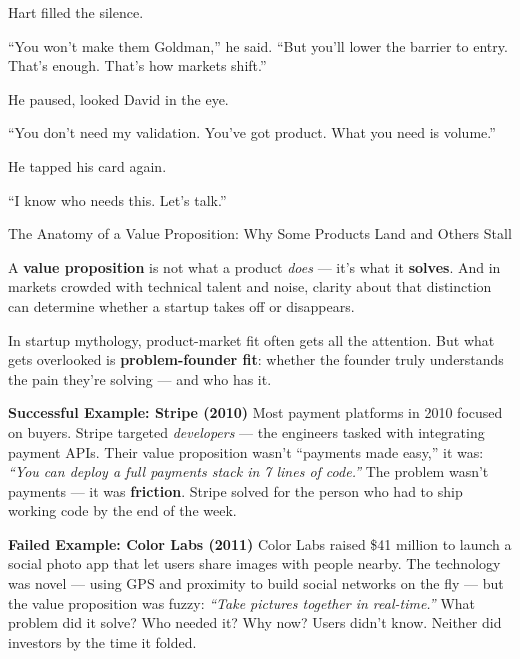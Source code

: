 Hart filled the silence.

“You won’t make them Goldman,” he said. “But you’ll lower the barrier to entry. That’s enough. That’s how markets shift.”

\medskip

He paused, looked David in the eye.

“You don’t need my validation. You’ve got product. What you need is volume.”

\medskip

He tapped his card again.

``I know who needs this. Let’s talk.''

\medskip

\begin{HistoricalSidebar}{The Anatomy of a Value Proposition: Why Some Products Land and Others Stall}

  A \textbf{value proposition} is not what a product \textit{does} — it's what it \textbf{solves}. And in markets 
  crowded with technical talent and noise, clarity about that distinction can determine whether a startup takes 
  off or disappears.
  
  \medskip
  
  In startup mythology, product-market fit often gets all the attention. But what gets overlooked is \textbf{problem-founder fit}: 
  whether the founder truly understands the pain they’re solving — and who has it.
  
  \medskip
  
  \textbf{Successful Example: Stripe (2010)}  
  Most payment platforms in 2010 focused on buyers. Stripe targeted \textit{developers} — the engineers tasked with integrating 
  payment APIs. Their value proposition wasn’t “payments made easy,” it was:  
  \textit{“You can deploy a full payments stack in 7 lines of code.”}  
  The problem wasn’t payments — it was \textbf{friction}. Stripe solved for the person who had to ship working code by the end 
  of the week.
  
  \medskip
  
  \textbf{Failed Example: Color Labs (2011)}  
  Color Labs raised \$41 million to launch a social photo app that let users share images with people nearby. The technology 
  was novel — using GPS and proximity to build social networks on the fly — but the value proposition was fuzzy:  
  \textit{“Take pictures together in real-time.”}  
  What problem did it solve? Who needed it? Why now? Users didn’t know. Neither did investors by the time it folded.
  

\end{HistoricalSidebar}
